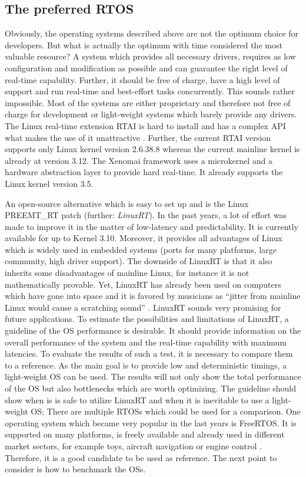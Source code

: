 \subsection{The preferred RTOS}
Obviously, the operating systems described above are not the optimum choice for developers. 
But what is actually the optimum with time considered the most valuable resource?
A system which provides all necessary drivers, requires as low configuration and modification as possible and can guarantee the right level of real-time capability. 
Further, it should be free of charge, have a high level of support and run real-time and best-effort tasks concurrently.
This sounds rather impossible. 
Most of the systems are either proprietary and therefore not free of charge for development or light-weight systems which barely provide any drivers.
The Linux real-time extension \ac{RTAI} is hard to install and has a complex \ac{API} what makes the use of it unattractive \cite{mitschang:heulfrvr}.
Further, the current \ac{RTAI} version supports only Linux kernel version 2.6.38.8 \cite{rtai} whereas the current mainline kernel is already at version 3.12. 
The Xenomai framework uses a microkernel and a hardware abstraction layer to provide hard real-time. 
It already supports the Linux kernel version 3.5.
\par
An open-source alternative which is easy to set up and is the Linux PREEMT\_RT patch (further: \textit{LinuxRT}).
In the past years, a lot of effort was made to improve it in the matter of low-latency and predictability.
It is currently available for up to Kernel 3.10.
Moreover, it provides all advantages of Linux which is widely used in embedded systems (ports for many platforms, large community, high driver support).
The downside of LinuxRT is that it also inherits some disadvantages of mainline Linux, for instance it is not mathematically provable.
Yet, LinuxRT has already been used on computers which have gone into space and it is favored by musicians as ``jitter from mainline Linux would cause a scratching sound'' \cite{clark:itrtlfed}.
LinuxRT sounds very promising for future applications.
To estimate the possibilities and limitations of LinuxRT, a guideline of the \ac {OS} performance is desirable.
It should provide information on the overall performance of the system and the real-time capability with maximum latencies.  
To evaluate the results of such a test, it is necessary to compare them to a reference. 
As the main goal is to provide low and deterministic timings, a light-weight \ac{OS} can be used.
The results will not only show the total performance of the \ac{OS} but also bottlenecks which are worth optimizing. 
The guideline should show when is is safe to utilize LinuxRT and when it is inevitable to use a light-weight \ac{OS};
There are multiple \acp{RTOS} which could be used for a comparison. 
One operating system which became very popular in the last years is FreeRTOS.
It is supported on many platforms, is freely available and already used in different market sectors, for example toys, aircraft navigation or engine control \cite{freertos}. 
Therefore, it is a good candidate to be used as reference.  
The next point to consider is how to benchmark the \acp{OS}.
 
